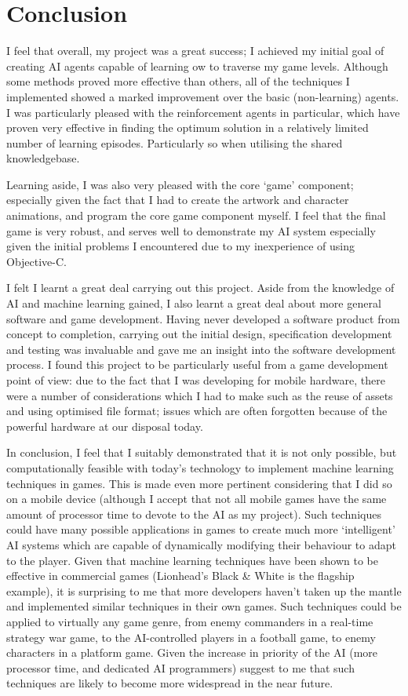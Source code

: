 \documentclass[a4paper,oneside]{report}
\begin{document}
\section{Conclusion}

I feel that overall, my project was a great success; I achieved my initial goal of creating AI agents capable of learning ow to traverse my game levels. Although some methods proved more effective than others, all of the techniques I implemented showed a marked improvement over the basic (non-learning) agents. I was particularly pleased with the reinforcement agents in particular, which have proven very effective in finding the optimum solution in a relatively limited number of learning episodes. Particularly so when utilising the shared knowledgebase. 

Learning aside, I was also very pleased with the core `game' component; especially given the fact that I had to create the artwork and character animations, and program the core game component myself. I feel that the final game is very robust, and serves well to demonstrate my AI system especially given the initial problems I encountered due to my inexperience of using Objective-C.

I felt I learnt a great deal carrying out this project. Aside from the knowledge of AI and machine learning gained, I also learnt a great deal about more general software and game development. Having never developed a software product from concept to completion, carrying out the initial design, specification development and testing was invaluable and gave me an insight into the software development process. I found this project to be particularly useful from a game development point of view: due to the fact that I was developing for mobile hardware, there were a number of considerations which I had to make such as the reuse of assets and using optimised file format; issues which are often forgotten because of the powerful hardware at our disposal today.

In conclusion, I feel that I suitably demonstrated that it is not only possible, but computationally feasible with today's technology to implement machine learning techniques in games. This is made even more pertinent considering that I did so on a mobile device (although I accept that not all mobile games have the same amount of processor time to devote to the AI as my project). Such techniques could have many possible applications in games to create much more `intelligent' AI systems which are capable of dynamically modifying their behaviour to adapt to the player. Given that machine learning techniques have been shown to be effective in commercial games (Lionhead's Black \& White is the flagship example), it is surprising to me that more developers haven't taken up the mantle and implemented similar techniques in their own games. Such techniques could be applied to virtually any game genre, from enemy commanders in a real-time strategy war game, to the AI-controlled players in a football game, to enemy characters in a platform game. Given the increase in priority of the AI (more processor time, and dedicated AI programmers) suggest to me that such techniques are likely to become more widespread in the near future. 
\end{document}
